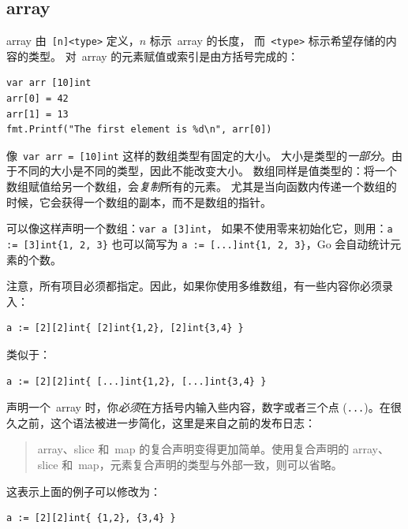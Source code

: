 \subsection{array}
array 由~\verb|[n]<type>| 定义，$n$ 标示~array 的长度，
而~\verb|<type>| 标示希望存储的内容的类型。
对~array 的元素赋值或索引是由方括号完成的：
\begin{lstlisting}
var arr [10]int
arr[0] = 42
arr[1] = 13
fmt.Printf("The first element is %d\n", arr[0])
\end{lstlisting}
像~\lstinline{var arr = [10]int} 这样的数组类型有固定的大小。
大小是类型的\emph{一部分}。由于不同的大小是不同的类型，因此不能改变大小。
数组同样是值类型的：将一个数组赋值给另一个数组，会\emph{复制}所有的元素。
尤其是当向函数内传递一个数组的时候，它会获得一个数组的副本，而不是数组的指针。

可以像这样声明一个数组：\lstinline{var a [3]int}，
如果不使用零来初始化它，则用：\lstinline|a := [3]int{1, 2, 3}| 也可以简写为
\lstinline|a := [...]int{1, 2, 3}|，Go 会自动统计元素的个数。

注意，所有项目必须都指定。因此，如果你使用多维数组，有一些内容你必须录入：
\begin{lstlisting}
a := [2][2]int{ [2]int{1,2}, [2]int{3,4} }
\end{lstlisting}
类似于：
\begin{lstlisting}
a := [2][2]int{ [...]int{1,2}, [...]int{3,4} }
\end{lstlisting}
声明一个~array 时，你\emph{必须}在方括号内输入些内容，数字或者三个点
(\verb|...|)。在很久之前，这个语法被进一步简化，这里是来自之前的发布日志：
\begin{quote}
array、slice 和~map 的复合声明变得更加简单。使用复合声明的
array、slice 和~map，元素复合声明的类型与外部一致，则可以省略。
\end{quote}
这表示上面的例子可以修改为：
\begin{lstlisting}
a := [2][2]int{ {1,2}, {3,4} }
\end{lstlisting}

